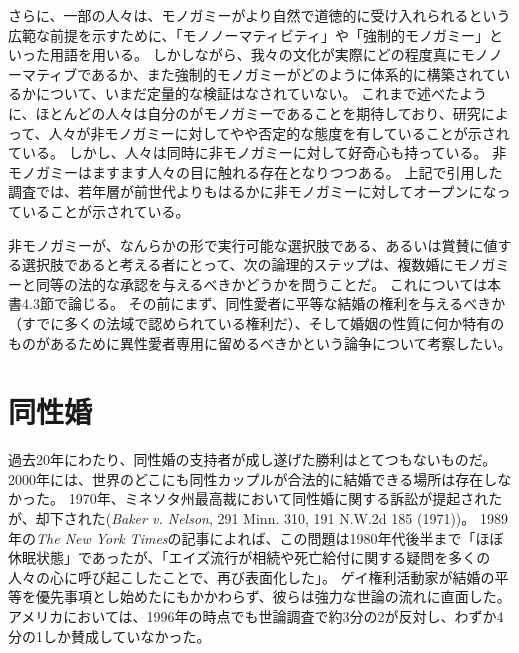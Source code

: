 \documentclass[paper=a4,book,openany]{jlreq}
\begin{document}
さらに、一部の人々は、モノガミーがより自然で道徳的に受け入れられるという広範な前提を示すために、「モノノーマティビティ」や「強制的モノガミー」といった用語を用いる。
しかしながら、我々の文化が実際にどの程度真にモノノーマティブであるか、また強制的モノガミーがどのように体系的に構築されているかについて、いまだ定量的な検証はなされていない。
これまで述べたように、ほとんどの人々は自分のがモノガミーであることを期待しており、研究によって、人々が非モノガミーに対してやや否定的な態度を有していることが示されている\citep{conley13:_fewer_merrier}。
しかし、人々は同時に非モノガミーに対して好奇心も持っている。
非モノガミーはますます人々の目に触れる存在となりつつある。
上記で引用した調査では、若年層が前世代よりもはるかに非モノガミーに対してオープンになっていることが示されている。

非モノガミーが、なんらかの形で実行可能な選択肢である、あるいは賞賛に値する選択肢であると考える者にとって、次の論理的ステップは、複数婚にモノガミーと同等の法的な承認を与えるべきかどうかを問うことだ。
これについては本書4.3節で論じる。
その前にまず、同性愛者に平等な結婚の権利を与えるべきか（すでに多くの法域で認められている権利だ）、そして婚姻の性質に何か特有のものがあるために異性愛者専用に留めるべきかという論争について考察したい。

\section{同性婚}

過去20年にわたり、同性婚の支持者が成し遂げた勝利はとてつもないものだ。
2000年には、世界のどこにも同性カップルが合法的に結婚できる場所は存在しなかった。
1970年、ミネソタ州最高裁において同性婚に関する訴訟が提起されたが、却下された(\emph{Baker v. Nelson}, 291 Minn. 310, 191 N.W.2d 185 (1971))。
1989年の\emph{The New York Times}の記事によれば、この問題は1980年代後半まで「ほぼ休眠状態」であったが、「エイズ流行が相続や死亡給付に関する疑問を多くの人々の心に呼び起こしたことで、再び表面化した」\citep{gutis89:_small_steps_accep_renew_debat_gay_marriag}。
ゲイ権利活動家が結婚の平等を優先事項とし始めたにもかかわらず、彼らは強力な世論の流れに直面した。
アメリカにおいては、1996年の時点でも世論調査で約3分の2が反対し、わずか4分の1しか賛成していなかった\citep{center12:_growin_public_suppor_same_sex_marriag}。
\end{document}
